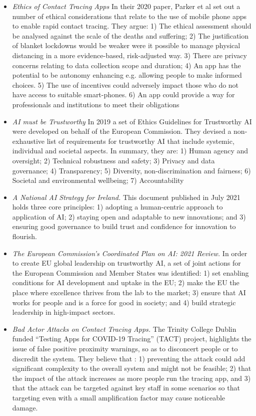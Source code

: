 \documentclass[conference]{IEEEtran}
\begin{document}
\begin{itemize}
\item {\emph{Ethics of Contact Tracing Apps}}\cite{b3}
In their 2020 paper, Parker et al set out
a number of ethical considerations that relate to the use of mobile phone apps to enable rapid contact tracing. They argue: 1) The ethical assessment should be analysed against the scale of the deaths and suffering; 2) The justification of blanket lockdowns would be weaker were it possible to manage physical distancing in a more evidence-based, risk-adjusted way. 3) There are privacy concerns relating to data collection scope and duration; 4) An app has the potential to be autonomy enhancing e.g. allowing people to make informed choices. 5) The use of incentives could adversely impact those who do not have access to suitable smart-phones. 6) An app could provide a way for professionals and institutions to meet their obligations 
\item {\emph{AI must be Trustworthy}}\cite{b3}
In 2019 a set of Ethics Guidelines for Trustworthy AI were developed on behalf of the European Commission. They devised a non-exhaustive list of requirements for trustworthy AI that include systemic, individual and societal aspects. In summary, they are: 
1) Human agency and oversight;
2) Technical robustness and safety; 
3) Privacy and data governance; 4) Transparency; 
5) Diversity, non-discrimination and fairness;
6) Societal and environmental wellbeing;
7) Accountability 
\item {\emph{A National AI Strategy for Ireland.}}\cite{b3}
This document published in July 2021 holds three core principles: 1) adopting a human-centric approach to application of AI; 2) staying open and adaptable to new innovations; and 3) ensuring good governance to build trust and confidence for innovation to flourish. 
\item {\emph{The European Commission’s Coordinated Plan on AI: 2021 Review.}}\cite{b4}
In order to create EU global leadership on trustworthy AI, a set of joint actions for the European Commission and Member States was identified: 1) set enabling conditions for AI development and uptake in the EU; 2) make the EU the place where excellence thrives from the lab to the market; 3) ensure that AI works for people and is a force for good in society; and 4) build strategic leadership in high-impact sectors.
\item {\emph{Bad Actor Attacks on Contact Tracing Apps.}}\cite{b5}
The Trinity College Dublin funded “Testing Apps for COVID-19 Tracing” (TACT) project, highlights the issue of false positive proximity warnings, so as to disconcert people or to discredit the system. They believe that : 1) preventing the attack could add significant complexity to the overall system and might not be feasible; 2) that the impact of the attack increases as more people run the tracing app, and 3) that the attack can be targeted against key staff in some scenarios so that targeting even with a small amplification factor may cause noticeable damage.

\end{itemize}
\end{document}
